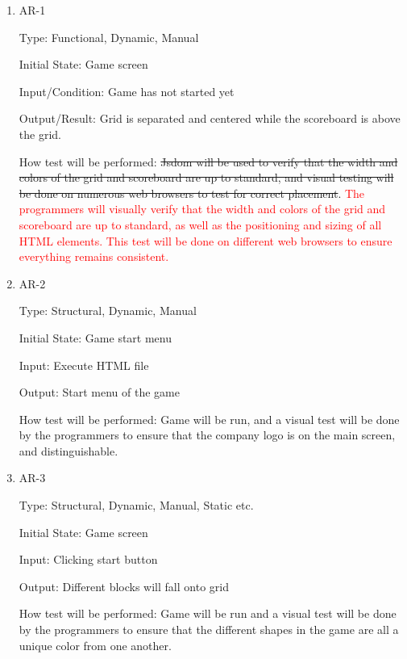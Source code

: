 \documentclass[12pt, titlepage]{article}
\begin{document}
\begin{enumerate}

\item{AR-1\\}

Type: Functional, Dynamic, Manual
					
Initial State: Game screen 
					
Input/Condition: Game has not started yet  
					
Output/Result: Grid is separated and centered while the scoreboard is above the grid.
					
How test will be performed: \sout{Jsdom will be used to verify that the width and colors of the grid and scoreboard are up to standard, and visual testing will be done on numerous web browsers to test for correct placement}. \textcolor{red}{The programmers will visually verify that the width and colors of the grid and scoreboard are up to standard, as well as the positioning and sizing of all HTML elements. This test will be done on different web browsers to ensure everything remains consistent.}
					
\item{AR-2\\}

Type: Structural, Dynamic, Manual
					
Initial State: Game start menu
					
Input: Execute HTML file
					
Output: Start menu of the game
					
How test will be performed: Game will be run, and a visual test will be done by the programmers to ensure that the company logo is on the main screen, and distinguishable. 

\item{AR-3\\}

Type: Structural, Dynamic, Manual, Static etc.
					
Initial State: Game screen
					
Input: Clicking start button 
					
Output: Different blocks will fall onto grid
					
How test will be performed: Game will be run and a visual test will be done by the programmers to ensure that the different shapes in the game are all a unique color from one another. 

\end{enumerate}
\end{document}
